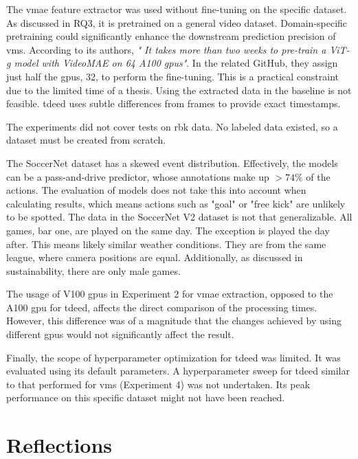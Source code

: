 The \acrshort{vmae} feature extractor was used without fine-tuning on the specific dataset. As discussed in RQ3, it is pretrained on a general video dataset. Domain-specific pretraining could significantly enhance the downstream prediction precision of \acrshort{vms}. According to its authors, \textit{" It takes more than two weeks to pre-train a ViT-g model with VideoMAE on 64 A100 \acrshort{gpu}s"}\cite{wang_videomae_2023}. In the related GitHub, they assign just half the \acrshort{gpu}s, 32, to perform the fine-tuning. This is a practical constraint due to the limited time of a thesis. Using the extracted data in the baseline is not feasible. \acrshort{tdeed} uses subtle differences from frames to provide exact timestamps. 

The experiments did not cover tests on \acrfull{rbk} data. No labeled data existed, so a dataset must be created from scratch. 

The SoccerNet dataset has a skewed event distribution. Effectively, the models can be a pass-and-drive predictor, whose annotations make up $>74\%$ of the actions. The evaluation of models does not take this into account when calculating results, which means actions such as "goal" or "free kick" are unlikely to be spotted. The data in the SoccerNet V2 dataset is not that generalizable. All games, bar one, are played on the same day. The exception is played the day after. This means likely similar weather conditions. They are from the same league, where camera positions are equal. Additionally, as discussed in sustainability, there are only male games. 

The usage of V100 \acrshort{gpu}s in Experiment 2 for \acrshort{vmae} extraction, opposed to the A100 \acrshort{gpu} for \acrshort{tdeed}, affects the direct comparison of the processing times. However, this difference was of a magnitude that the changes achieved by using different \acrshort{gpu}s would not significantly affect the result. 

Finally, the scope of hyperparameter optimization for \acrshort{tdeed} was limited. It was evaluated using its default parameters. A hyperparameter sweep for \acrshort{tdeed} similar to that performed for \acrshort{vms} (Experiment 4) was not undertaken. Its peak performance on this specific dataset might not have been reached. 

\section{Reflections}


